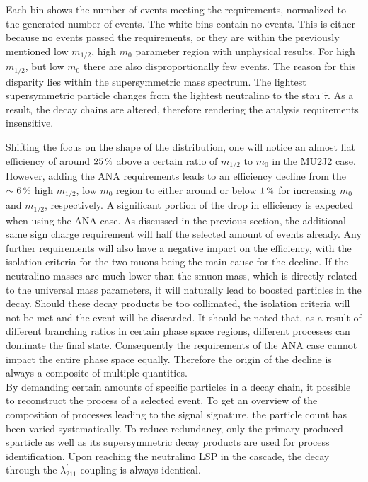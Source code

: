 \noindent Each bin shows the number of events meeting the requirements, normalized to the generated number of events. The white bins contain no events. This is either because no events passed the requirements, or they are within the previously mentioned low $m_{1/2}$, high $m_0$ parameter region with unphysical results. For high $m_{1/2}$, but low $m_0$ there are also disproportionally few events. The reason for this disparity lies within the supersymmetric mass spectrum. The lightest supersymmetric particle changes from the lightest neutralino to the stau $\tilde{\tau}$. As a result, the decay chains are altered, therefore rendering the analysis requirements insensitive. 

Shifting the focus on the shape of the distribution, one will notice an almost flat efficiency of around $25\,\pct$ above a certain ratio of $m_{1/2}$ to $m_0$ in the MU2J2 case. However, adding the ANA requirements leads to an efficiency decline from the $\sim 6\,\pct$ high $m_{1/2}$, low $m_0$ region to either around or below $1\,\pct$ for increasing $m_0$ and $m_{1/2}$, respectively. A significant portion of the drop in efficiency is expected when using the ANA case. As discussed in the previous section, the additional same sign charge requirement will half the selected amount of events already. Any further requirements will also have a negative impact on the efficiency, with the isolation criteria for the two muons being the main cause for the decline. If the neutralino masses are much lower than the smuon mass, which is directly related to the universal mass parameters, it will naturally lead to boosted particles in the decay. Should these decay products be too collimated, the isolation criteria will not be met and the event will be discarded. It should be noted that, as a result of different branching ratios in certain phase space regions, different processes can dominate the final state. Consequently the requirements of the ANA case cannot impact the entire phase space equally. Therefore the origin of the decline is always a composite of multiple quantities. \\

By demanding certain amounts of specific particles in a decay chain, it possible to reconstruct the process of a selected event. To get an overview of the composition of processes leading to the signal signature, the particle count has been varied systematically. To reduce redundancy, only the primary produced sparticle as well as its supersymmetric decay products are used for process identification. Upon reaching the neutralino LSP in the cascade, the decay through the $\lambda^\prime_{211}$ coupling is always identical.

